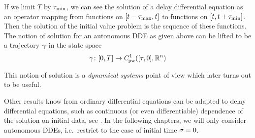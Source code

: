        \cite{Roussel04DDEs}
    If we limit $T$ by $\tau_{\min}$, we can see the solution of a delay differential equation as an operator mapping from functions on $[t-\tau_{\max},t]$ to functions on $[t,t+\tau_{\min}]$.
    Then the solution of the initial value problem is the sequence of these functions.
    The notion of solution for an autonomous DDE as given above can be lifted to be a trajectory $\gamma$ in the state space
    \begin{equation}
        \trajectory \from [0,T] \to \statespace[\tau]%
    \end{equation}

    This notion of solution is a \emph{dynamical systems} point of view which later turns out to be useful.

    Other results know from ordinary differential equations can be adapted to delay differential equations, such as continuous (or even differentiable) dependence of the solution on initial data, see \cite{Dads06DDEs}. %
    In the following chapters, we will only consider autonomous DDEs, i.e.\ restrict to the case of initial time $\sigma=0$.






